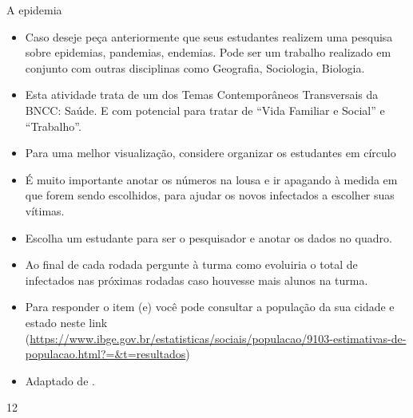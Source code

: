 \begin{sugestions}{A epidemia}
{
	\begin{itemize}
	\item Caso deseje peça anteriormente que seus estudantes realizem uma pesquisa sobre epidemias, pandemias, endemias. Pode ser um trabalho realizado em conjunto com outras disciplinas como Geografia, Sociologia, Biologia.
	\item Esta atividade trata de um dos Temas Contemporâneos Transversais da BNCC: Saúde. E com potencial para tratar de “Vida Familiar e Social” e “Trabalho”.
	\item Para uma melhor visualização, considere organizar os estudantes em círculo
	\item É muito importante anotar os números na lousa e ir apagando à medida em que forem sendo escolhidos, para ajudar os novos infectados a escolher suas vítimas.
	\item Escolha um estudante para ser o pesquisador e anotar os dados no quadro.
	\item Ao final de cada rodada pergunte à turma como evoluiria o total de infectados nas próximas rodadas caso houvesse mais alunos na turma.
	\item Para responder o item (e) você pode consultar a população da sua cidade e estado neste link (\url{https://www.ibge.gov.br/estatisticas/sociais/populacao/9103-estimativas-de-populacao.html?=&t=resultados})
	\item Adaptado de \citep{Bush2015}.
	\end{itemize}
}{1}{2}
\end{sugestions}
